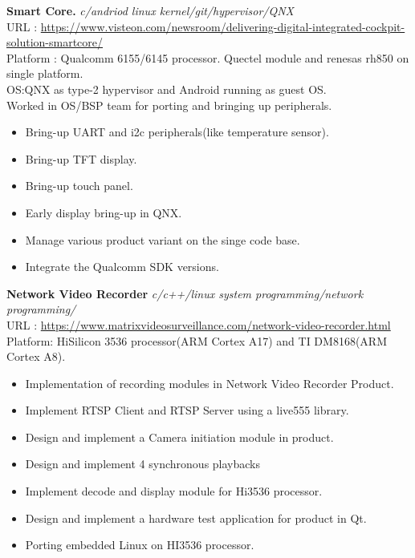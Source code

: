 \documentclass[a4paper]{article}
\begin{document}
{\textbf{Smart Core.}} {\sl c/andriod linux kernel/git/hypervisor/QNX} \\ 
URL : \url{https://www.visteon.com/newsroom/delivering-digital-integrated-cockpit-solution-smartcore/} \\
\vspace*{1mm}
Platform : Qualcomm 6155/6145 processor. Quectel module and renesas rh850 on single platform.\\
OS:QNX as type-2 hypervisor and Android running as guest OS. \\ Worked in OS/BSP team for porting and bringing up peripherals. \\
\begin{itemize} \itemsep 0.5pt
\item Bring-up UART and i2c peripherals(like temperature sensor).
\item Bring-up TFT display. 
\item Bring-up touch panel.
\item Early display bring-up in QNX.
\item Manage various product variant on the singe code base.
\item Integrate the Qualcomm SDK versions.
\end{itemize}
\vspace*{2mm}

{\textbf{Network Video Recorder}} {\sl c/c++/linux system programming/network programming/} \\
URL : \url{https://www.matrixvideosurveillance.com/network-video-recorder.html} \\
\vspace*{1mm}
Platform: HiSilicon 3536 processor(ARM Cortex A17) and TI DM8168(ARM Cortex A8). \\
\begin{itemize} \itemsep 0.5pt
\item Implementation of recording modules in Network Video Recorder Product.
\item Implement RTSP Client and RTSP Server using a live555 library.
\item Design and implement a Camera initiation module in product.
\item Design and implement 4 synchronous playbacks
\item Implement decode and display module for Hi3536 processor.
\item Design and implement a hardware test application for product in Qt.
\item Porting embedded Linux on HI3536 processor.
\end{itemize}
\vspace*{2mm}
\end{document}
